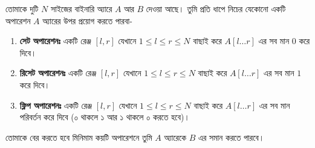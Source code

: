 \begin{problem}
তোমাকে দুটি $N$ সাইজের বাইনারি অ্যারে $A$ আর $B$ দেওয়া আছে। তুমি প্রতি ধাপে নিচের যেকোনো একটি অপারেশন $A$ অ্যারের উপর প্রয়োগ করতে পারবা-
\begin{enumerate}
	\item \textbf{সেট অপারেশনঃ} একটি রেঞ্জ $[l, r]$ যেখানে $1 \le l \le r \le N$ বাছাই করে $A[l \ldots r]$ এর সব মান $0$ করে দিবে।
	\item \textbf{রিসেট অপারেশনঃ} একটি রেঞ্জ $[l, r]$ যেখানে $1 \le l \le r \le N$ বাছাই করে $A[l \ldots r]$ এর সব মান $1$ করে দিবে।
	\item \textbf{ফ্লিপ অপারেশনঃ} একটি রেঞ্জ $[l, r]$ যেখানে $1 \le l \le r \le N$ বাছাই করে $A[l \ldots r]$ এর সব মান পরিবর্তন করে দিবে (০ থাকলে ১ আর ১ থাকলে ০ করতে হবে)।
\end{enumerate}
তোমাকে বের করতে হবে মিনিমাম কয়টি অপারেশনে তুমি $A$ অ্যারেকে $B$ এর সমান করতে পারবে।
\end{problem}
